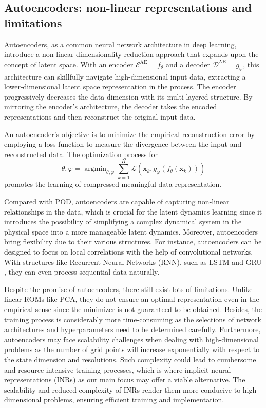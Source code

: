 \documentclass{article}
\newcommand{\mE}{\mathcal{E}}
\newcommand{\mD}{\mathcal{D}}
\DeclareMathOperator*{\argmin}{argmin}
\begin{document}
\subsection{Autoencoders: non-linear representations and limitations}
Autoencoders, as a common neural network architecture in deep learning, introduce a non-linear dimensionality reduction approach that expands upon the concept of latent space. With an encoder $\mE^{\textrm{AE}}=f_\theta$ and a decoder $\mD^{\textrm{AE}}=g_\varphi$, this architecture can skillfully navigate high-dimensional input data, extracting a lower-dimensional latent space representation in the process. The encoder progressively decreases the data dimension with its multi-layered structure. By mirroring the encoder's architecture, the decoder takes the encoded representations and then reconstruct the original input data.

An autoencoder's objective is to minimize the empirical reconstruction error by employing a loss function to measure the divergence between the input and reconstructed data. The optimization process for
\[\theta,\varphi=\argmin_{\theta,\varphi}\sum_{k=1}^K\mathcal{L}(\bm x_k,g_\varphi(f_\theta(\bm x_k)))\]
promotes the learning of compressed meaningful data representation.

Compared with POD, autoencoders are capable of capturing non-linear relationships in the data, which is crucial for the latent dynamics learning since it introduces the possibility of simplifying a complex dynamical system in the physical space into a more manageable latent dynamics. Moreover, autoencoders bring flexibility due to their various structures. For instance, autoencoders can be designed to focus on local correlations with the help of convolutional networks. With structures like Recurrent Neural Networks (RNN), such as LSTM \cite{LSTM} and GRU \cite{GRU}, they can even process sequential data naturally.

Despite the promise of autoencoders, there still exist lots of limitations.
Unlike linear ROMs like PCA, they do not ensure an optimal representation even in the empirical sense since the minimizer is not guaranteed to be obtained. Besides, the training process is considerably more time-consuming as the selections of network architectures and hyperparameters need to be determined carefully. Furthermore, autoencoders may face scalability challenges when dealing with high-dimensional problems as the number of grid points will increase exponentially with respect to the state dimension and resolutions. Such complexity could lead to cumbersome and resource-intensive training processes, which is where implicit neural representations (INRs) as our main focus may offer a viable alternative. The scalability and reduced complexity of INRs render them more conducive to high-dimensional problems, ensuring efficient training and implementation.
\end{document}
